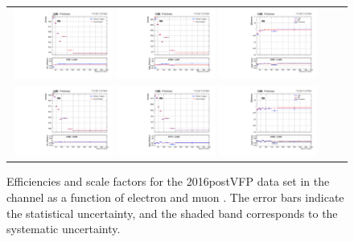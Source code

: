 {\begin{figure}[h]
  \begin{center}
    \begin{tabular}{ccc}
      \includegraphics[width=0.32\textwidth]{fig_2016postVFP_TrigSF/g_lepApt_emu_MC.pdf}
      \includegraphics[width=0.32\textwidth]{fig_2016postVFP_TrigSF/g_lepApt_emu_data.pdf}
      \includegraphics[width=0.32\textwidth]{fig_2016postVFP_TrigSF/g_emu_lepApt_FullSystUncBand.pdf}\\
      \includegraphics[width=0.32\textwidth]{fig_2016postVFP_TrigSF/g_lepBpt_emu_MC.pdf}
      \includegraphics[width=0.32\textwidth]{fig_2016postVFP_TrigSF/g_lepBpt_emu_data.pdf}
      \includegraphics[width=0.32\textwidth]{fig_2016postVFP_TrigSF/g_emu_lepBpt_FullSystUncBand.pdf}\\
    \end{tabular}
    \caption{Efficiencies and scale factors for the 2016postVFP data set in the \emu channel as a function of electron and muon \pT.
            The error bars indicate the statistical uncertainty, and the shaded band corresponds to the systematic uncertainty.
            }
    \label{TrigSF_2016postVFP_1}
  \end{center}
\end{figure}

}
